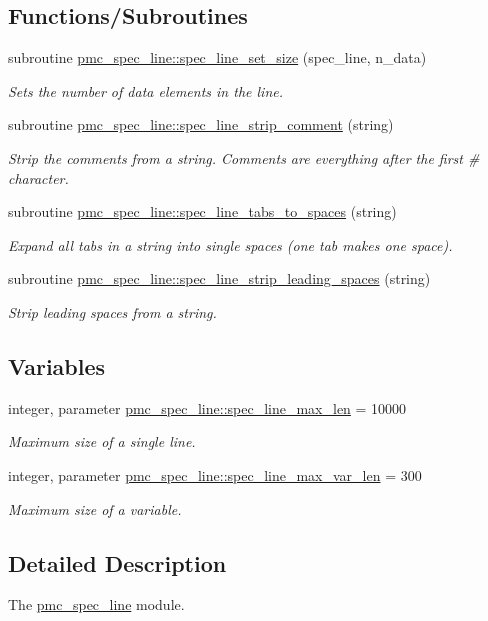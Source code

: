 \subsection*{Functions/\+Subroutines}
\begin{DoxyCompactItemize}
\item 
subroutine \mbox{\hyperlink{namespacepmc__spec__line_a1db0d0ef2b767a6540419a294120851e}{pmc\+\_\+spec\+\_\+line\+::spec\+\_\+line\+\_\+set\+\_\+size}} (spec\+\_\+line, n\+\_\+data)
\begin{DoxyCompactList}\small\item\em Sets the number of data elements in the line. \end{DoxyCompactList}\item 
subroutine \mbox{\hyperlink{namespacepmc__spec__line_ae8dbd59b9a8d4aa132d5931c8cae419f}{pmc\+\_\+spec\+\_\+line\+::spec\+\_\+line\+\_\+strip\+\_\+comment}} (string)
\begin{DoxyCompactList}\small\item\em Strip the comments from a string. Comments are everything after the first \# character. \end{DoxyCompactList}\item 
subroutine \mbox{\hyperlink{namespacepmc__spec__line_a8bcfccca38c2d4044b3ab638b119f108}{pmc\+\_\+spec\+\_\+line\+::spec\+\_\+line\+\_\+tabs\+\_\+to\+\_\+spaces}} (string)
\begin{DoxyCompactList}\small\item\em Expand all tabs in a string into single spaces (one tab makes one space). \end{DoxyCompactList}\item 
subroutine \mbox{\hyperlink{namespacepmc__spec__line_a70e8cfe2c200d354b7c3ab329854b260}{pmc\+\_\+spec\+\_\+line\+::spec\+\_\+line\+\_\+strip\+\_\+leading\+\_\+spaces}} (string)
\begin{DoxyCompactList}\small\item\em Strip leading spaces from a string. \end{DoxyCompactList}\end{DoxyCompactItemize}
\subsection*{Variables}
\begin{DoxyCompactItemize}
\item 
integer, parameter \mbox{\hyperlink{namespacepmc__spec__line_ae50dbe2c181c483be6cfc87cd3a217d0}{pmc\+\_\+spec\+\_\+line\+::spec\+\_\+line\+\_\+max\+\_\+len}} = 10000
\begin{DoxyCompactList}\small\item\em Maximum size of a single line. \end{DoxyCompactList}\item 
integer, parameter \mbox{\hyperlink{namespacepmc__spec__line_a54f3958fcd2d7924fc1b9659e5442876}{pmc\+\_\+spec\+\_\+line\+::spec\+\_\+line\+\_\+max\+\_\+var\+\_\+len}} = 300
\begin{DoxyCompactList}\small\item\em Maximum size of a variable. \end{DoxyCompactList}\end{DoxyCompactItemize}


\subsection{Detailed Description}
The \mbox{\hyperlink{namespacepmc__spec__line}{pmc\+\_\+spec\+\_\+line}} module. 

